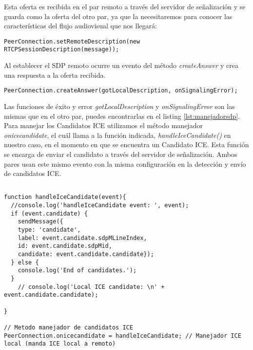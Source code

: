 Esta oferta es recibida en el par remoto a través del servidor de señalización y se guarda como la oferta del otro par, ya que la necesitaremos para conocer las características del flujo audiovisual que nos llegará:\\


\begin{lstlisting}[caption={Estableciendo SDP del par remoto.}]
PeerConnection.setRemoteDescription(new RTCPSessionDescription(message));
\end{lstlisting}

Al establecer el SDP remoto ocurre un evento del método \emph{createAnswer} y crea una respuesta a la oferta recibida.\\

\begin{lstlisting}[caption=Manejador de respuestas SDP]
PeerConnection.createAnswer(gotLocalDescription, onSignalingError);
\end{lstlisting}


Las funciones de éxito y error \emph{gotLocalDescription} y \emph{onSignalingError} son las mismas que en el otro par, puedes encontrarlas en el listing \ref{lst:manejadorsdp}.\\

Para manejar los Candidatos ICE utilizamos el método manejador \emph{onicecandidate}, el cuál llama a la función indicada, \emph{handleIceCandidate()} en nuestro caso, en el momento en que se encuentra un Candidato ICE. Esta función se encarga de enviar el candidato a través del servidor de señalización. Ambos pares usan este mismo evento con la misma configuración en la detección y envío de candidatos ICE.\\

\begin{lstlisting}[caption=Manejador de los Candidatos ICE locales.]

function handleIceCandidate(event){
  //console.log('handleIceCandidate event: ', event);
  if (event.candidate) {
    sendMessage({
    type: 'candidate',
    label: event.candidate.sdpMLineIndex,
    id: event.candidate.sdpMid,
    candidate: event.candidate.candidate});
  } else {
    console.log('End of candidates.');
  }
    // console.log('Local ICE candidate: \n' + event.candidate.candidate);
  
}

// Metodo manejador de candidatos ICE
PeerConnection.onicecandidate = handleIceCandidate; // Manejador ICE local (manda ICE local a remoto)

\end{lstlisting}

